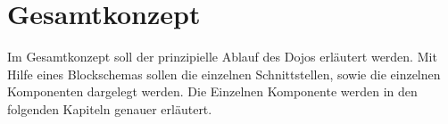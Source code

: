 \chapter{Gesamtkonzept}
\thispagestyle{fancy}  \setcounter{page}{1} \cfoot{\thepage} \renewcommand{\footrulewidth}{0.4pt} 
Im Gesamtkonzept soll der prinzipielle Ablauf des Dojos erläutert werden. Mit Hilfe eines Blockschemas sollen die einzelnen Schnittstellen, sowie die einzelnen Komponenten dargelegt werden. Die Einzelnen Komponente werden in den folgenden Kapiteln genauer erläutert.
